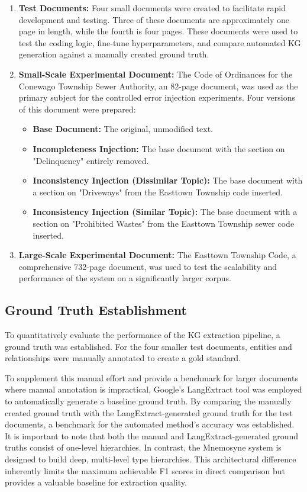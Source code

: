 \begin{enumerate}
    \item \textbf{Test Documents:} Four small documents were created to facilitate rapid development and testing. Three of these documents are approximately one page in length, while the fourth is four pages. These documents were used to test the coding logic, fine-tune hyperparameters, and compare automated KG generation against a manually created ground truth.
    \item \textbf{Small-Scale Experimental Document:} The Code of Ordinances for the Conewago Township Sewer Authority, an 82-page document, was used as the primary subject for the controlled error injection experiments. Four versions of this document were prepared:
    \begin{itemize}
        \item \textbf{Base Document:} The original, unmodified text.
        \item \textbf{Incompleteness Injection:} The base document with the section on "Delinquency" entirely removed.
        \item \textbf{Inconsistency Injection (Dissimilar Topic):} The base document with a section on "Driveways" from the Easttown Township code inserted.
        \item \textbf{Inconsistency Injection (Similar Topic):} The base document with a section on "Prohibited Wastes" from the Easttown Township sewer code inserted.
    \end{itemize}
    \item \textbf{Large-Scale Experimental Document:} The Easttown Township Code, a comprehensive 732-page document, was used to test the scalability and performance of the system on a significantly larger corpus.
\end{enumerate}

\subsection{Ground Truth Establishment}
\label{subsec:ground_truth}
To quantitatively evaluate the performance of the KG extraction pipeline, a ground truth was established. For the four smaller test documents, entities and relationships were manually annotated to create a gold standard.

To supplement this manual effort and provide a benchmark for larger documents where manual annotation is impractical, Google's LangExtract tool was employed to automatically generate a baseline ground truth. By comparing the manually created ground truth with the LangExtract-generated ground truth for the test documents, a benchmark for the automated method's accuracy was established. It is important to note that both the manual and LangExtract-generated ground truths consist of one-level hierarchies. In contrast, the Mnemosyne system is designed to build deep, multi-level type hierarchies. This architectural difference inherently limits the maximum achievable F1 scores in direct comparison but provides a valuable baseline for extraction quality.

